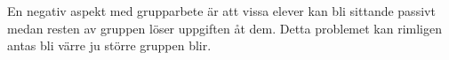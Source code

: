 

\textcolor{turkos} {
En negativ aspekt med grupparbete är att vissa elever kan bli sittande passivt medan resten av gruppen löser uppgiften åt dem\cite{RikaProblem}. Detta problemet kan rimligen antas bli värre ju större gruppen blir. 
}












